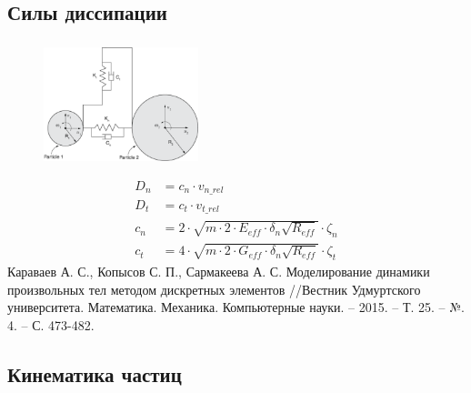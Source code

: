 \documentclass[c]{beamer}  %
\begin{document}
\subsection{Силы диссипации}

\begin{frame}
\frametitle{\insertsection} 
\framesubtitle{\insertsubsection}
\begin{figure}
	\centering
	\includegraphics[width=0.4\textwidth]{dempfer}
\end{figure} 
\begin{align*}
D_n &= c_n \cdot v_{n\_rel}\\
D_t &= c_t \cdot v_{t\_rel}\\
c_n &= 2 \cdot \sqrt{m \cdot 2 \cdot E_{eff} \cdot \delta_n \sqrt{R_{eff}}} \cdot \zeta_n \\
c_t &= 4 \cdot \sqrt{m \cdot 2 \cdot G_{eff} \cdot \delta_n \sqrt{R_{eff}}} \cdot \zeta_t
\end{align*}
Караваев А. С., Копысов С. П., Сармакеева А. С. Моделирование динамики произвольных тел методом дискретных элементов //Вестник Удмуртского университета. Математика. Механика. Компьютерные науки. – 2015. – Т. 25. – №. 4. – С. 473-482.
\end{frame}














\subsection{Кинематика частиц}
\end{document}
